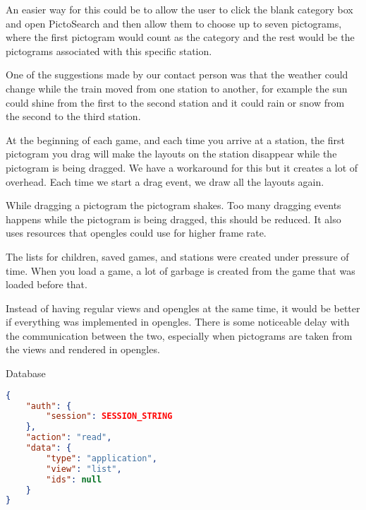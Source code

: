 \begin{description}
An easier way for this could be to allow the user to click the blank category box and open PictoSearch and then allow them to choose up to seven pictograms, where the first pictogram would count as the category and the rest would be the pictograms associated with this specific station.
\item[Changing weather] One of the suggestions made by our contact person was that the weather could change while the train moved from one station to another, for example the sun could shine from the first to the second station and it could rain or snow from the second to the third station. 
\item[Layouts disappear when drag starts] At the beginning of each game, and each time you arrive at a station, the first pictogram you drag will make the layouts on the station disappear while the pictogram is being dragged. We have a workaround for this but it creates a lot of overhead. Each time we start a drag event, we draw all the layouts again.
\item[Reduce drag events] While dragging a pictogram the pictogram shakes. Too many dragging events happens while the pictogram is being dragged, this should be reduced. It also uses resources that \ac{opengles} could use for higher frame rate.
\item[Customisation optimisation] The lists for children, saved games, and stations were created under pressure of time. When you load a game, a lot of garbage is created from the game that was loaded before that.
\item[Dragging of pictograms in \ac{opengles}] Instead of having regular views and \ac{opengles} at the same time, it would be better if everything was implemented in \ac{opengles}. There is some noticeable delay with the communication between the two, especially when pictograms are taken from the views and rendered in \ac{opengles}.
\item Database  
\begin{lstlisting}[language=json,firstnumber=1,caption={JSON guery to read application data},label=lst:jsonread]
{
	"auth": {
		"session": SESSION_STRING
	},
	"action": "read",
	"data": {
		"type": "application",
		"view": "list",
		"ids": null
	}
}
\end{lstlisting} 

\end{description}
